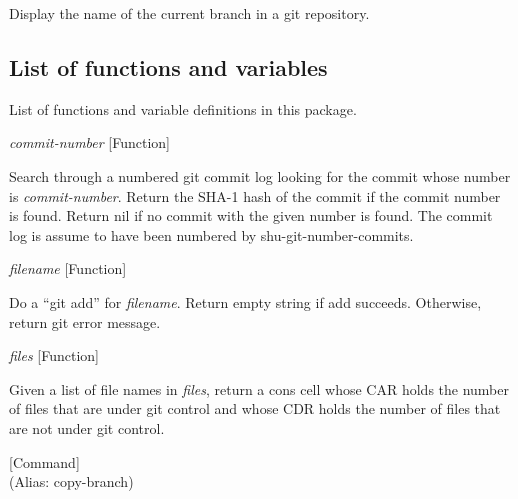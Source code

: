 \begin{doc-string}
Display the name of the current branch in a git repository.
\end{doc-string}

\subsection{List of functions and variables}

List of functions and variable definitions in this package.



\vspace{1em}
\noindent
{}
\usebox{\funcname}\emph{commit-number}
 \hfill [Function]

\begin{doc-string}
Search through a numbered git commit log looking for the commit whose number is
\emph{commit-number}.  Return the SHA-1 hash of the commit if the commit number is found.
Return nil if no commit with the given number is found.
The commit log is assume to have been numbered by shu-git-number-commits.
\end{doc-string}

\vspace{1em}
\noindent
{}
\usebox{\funcname}\emph{filename}
 \hfill [Function]

\begin{doc-string}
Do a ``git add'' for \emph{filename}.  Return empty string if add succeeds.  Otherwise,
return git error message.
\end{doc-string}

\vspace{1em}
\noindent
{}
\usebox{\funcname}\emph{files}
 \hfill [Function]

\begin{doc-string}
Given a list of file names in \emph{files}, return a cons cell whose CAR holds the
number of files that are under git control and whose CDR holds the number of
files that are not under git control.
\end{doc-string}

\vspace{1em}
\noindent
{}
\usebox{\funcname}
 \hfill [Command]\\%
 (Alias: copy-branch)

